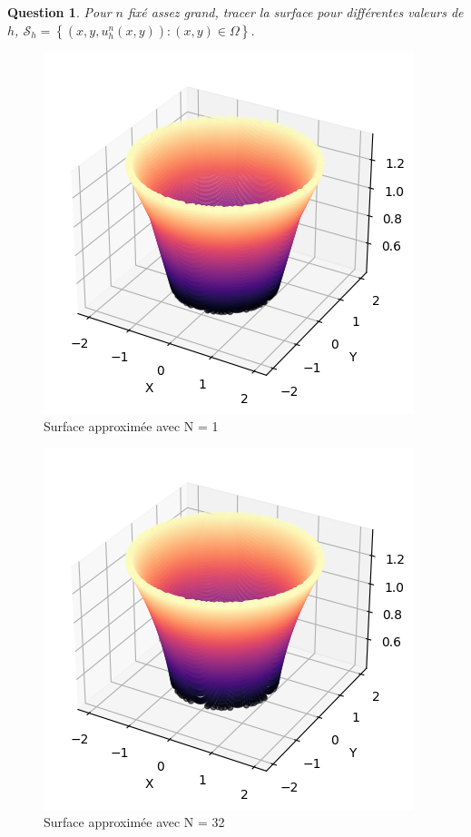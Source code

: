 \documentclass{article}
\newcommand{\Set}[1]{ \left\{ #1 \right\} }
\newtheorem{question}{Question}[subsection]
\newenvironment{answer}
  {\color{blue}}
  {}
\newcommand{\QuestionAnswer}[2]{
    \begin{question}
        #1
    \end{question}
    \begin{answer}
        #2
    \end{answer}
}
\begin{document}
\QuestionAnswer{
    Pour $n$ fixé assez grand, tracer la surface pour différentes valeurs de $h$, $\mathcal{S}_h = \Set{(x, y, u^n_h(x, y)) : (x, y) \in \Omega}$.
}{
    \begin{figure}[H]
        \centering
        \includegraphics[width=0.75\linewidth]{surfaceWith1.png}
        \caption{Surface approximée avec N = 1}
        \label{fig:surface_N1}
    \end{figure}

    \begin{figure}[H]
        \centering
        \includegraphics[width=0.75\linewidth]{surfaceWith32.png}
        \caption{Surface approximée avec N = 32}
        \label{fig:surface_N32}
    \end{figure}

}
\end{document}
